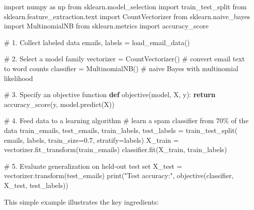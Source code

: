 \documentclass[
  9pt,
  letterpaper,
  abstract,
  titlepage]{scrbook}
\newenvironment{Shaded}{\begin{snugshade}}{\end{snugshade}}
\newcommand{\BuiltInTok}[1]{\textcolor[rgb]{0.00,0.23,0.31}{#1}}
\newcommand{\CommentTok}[1]{\textcolor[rgb]{0.37,0.37,0.37}{#1}}
\newcommand{\ControlFlowTok}[1]{\textcolor[rgb]{0.00,0.23,0.31}{\textbf{#1}}}
\newcommand{\FloatTok}[1]{\textcolor[rgb]{0.68,0.00,0.00}{#1}}
\newcommand{\ImportTok}[1]{\textcolor[rgb]{0.00,0.46,0.62}{#1}}
\newcommand{\KeywordTok}[1]{\textcolor[rgb]{0.00,0.23,0.31}{\textbf{#1}}}
\newcommand{\NormalTok}[1]{\textcolor[rgb]{0.00,0.23,0.31}{#1}}
\newcommand{\OperatorTok}[1]{\textcolor[rgb]{0.37,0.37,0.37}{#1}}
\newcommand{\StringTok}[1]{\textcolor[rgb]{0.13,0.47,0.30}{#1}}
\begin{document}
\begin{Shaded}
\begin{Highlighting}[]
\ImportTok{import}\NormalTok{ numpy }\ImportTok{as}\NormalTok{ np}
\ImportTok{from}\NormalTok{ sklearn.model\_selection }\ImportTok{import}\NormalTok{ train\_test\_split}
\ImportTok{from}\NormalTok{ sklearn.feature\_extraction.text }\ImportTok{import}\NormalTok{ CountVectorizer}
\ImportTok{from}\NormalTok{ sklearn.naive\_bayes }\ImportTok{import}\NormalTok{ MultinomialNB}
\ImportTok{from}\NormalTok{ sklearn.metrics }\ImportTok{import}\NormalTok{ accuracy\_score}

\CommentTok{\# 1. Collect labeled data }
\NormalTok{emails, labels }\OperatorTok{=}\NormalTok{ load\_email\_data()}

\CommentTok{\# 2. Select a model family}
\NormalTok{vectorizer }\OperatorTok{=}\NormalTok{ CountVectorizer()  }\CommentTok{\# convert email text to word counts}
\NormalTok{classifier }\OperatorTok{=}\NormalTok{ MultinomialNB()    }\CommentTok{\# naive Bayes with multinomial likelihood}

\CommentTok{\# 3. Specify an objective function}
\KeywordTok{def}\NormalTok{ objective(model, X, y):  }
    \ControlFlowTok{return}\NormalTok{ accuracy\_score(y, model.predict(X))}
    
\CommentTok{\# 4. Feed data to a learning algorithm}
\CommentTok{\# learn a spam classifier from 70\% of the data }
\NormalTok{train\_emails, test\_emails, train\_labels, test\_labels }\OperatorTok{=}\NormalTok{ train\_test\_split(}
\NormalTok{        emails, labels, train\_size}\OperatorTok{=}\FloatTok{0.7}\NormalTok{, stratify}\OperatorTok{=}\NormalTok{labels)  }
\NormalTok{X\_train }\OperatorTok{=}\NormalTok{ vectorizer.fit\_transform(train\_emails)}
\NormalTok{classifier.fit(X\_train, train\_labels)}

\CommentTok{\# 5. Evaluate generalization on held{-}out test set  }
\NormalTok{X\_test }\OperatorTok{=}\NormalTok{ vectorizer.transform(test\_emails)}
\BuiltInTok{print}\NormalTok{(}\StringTok{"Test accuracy:"}\NormalTok{, objective(classifier, X\_test, test\_labels))}
\end{Highlighting}
\end{Shaded}

This simple example illustrates the key ingredients:
\end{document}
